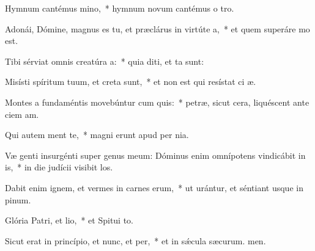 \item Hymnum cantémus mino,~* hymnum novum cantémus o tro.
\item Adonái, Dómine, magnus es tu, et præclárus in virtúte a,~* et quem superáre mo est.
\item Tibi sérviat omnis creatúra a:~* quia diti, et ta sunt:
\item Misísti spíritum tuum, et creta sunt,~* et non est qui resístat ci æ.
\item Montes a fundaméntis movebúntur cum quis:~* petræ, sicut cera, liquéscent ante ciem am.
\item Qui autem ment te,~* magni erunt apud  per nia.
\item Væ genti insurgénti super genus meum: Dóminus enim omnípotens vindicábit in is,~* in die judícii visibit los.
\item Dabit enim ignem, et vermes in carnes erum,~* ut urántur, et séntiant usque in pinum.
\item Glória Patri, et lio,~* et Spitui to.
\item Sicut erat in princípio, et nunc, et per,~* et in sǽcula sæcurum. men.
